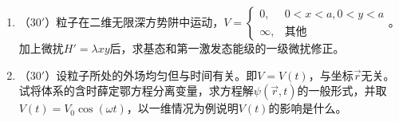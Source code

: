 \begin{enumerate}
\begin{enumerate}
\end{enumerate}


\banswer{
	
}

\newpage
\item 
（$30'$）粒子在二维无限深方势阱中运动，$V=\begin{cases}0,&0<x<a,0<y<a\\ \infty,&\text{其他}\end{cases}$。加上微扰$H'=\lambda xy$后，求基态和第一激发态能级的一级微扰修正。

\banswer{
	
}


\item 
（$30'$）设粒子所处的外场均匀但与时间有关。即$V=V(t)$，与坐标$\vec{r}$无关。试将体系的含时薛定鄂方程分离变量，求方程解$\psi(\vec{r},t)$的一般形式，并取$V(t)=V_0\cos(\omega t)$，以一维情况为例说明$V(t)$的影响是什么。

\banswer{
	
}



\end{enumerate}



